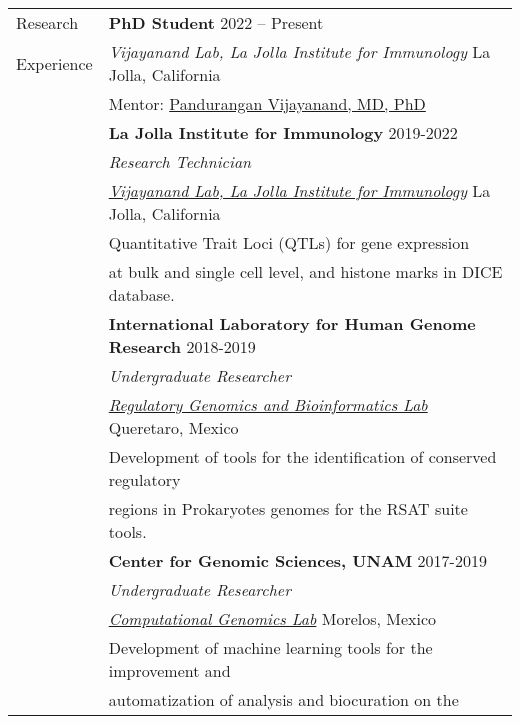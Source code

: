 \documentclass[letterpaper, 11pt]{article}
\begin{document}
\begin{longtable}{@{}p{1.1in}p{6.05in}}

{\sc Research} &
\textbf{PhD Student} \hfill 2022 -- Present   \\
{\sc Experience} & \textit{Vijayanand Lab, La Jolla Institute for Immunology} \hfill La Jolla, California \\
& Mentor: \href{https://www.lji.org/labs/vijayanand/}{Pandurangan Vijayanand, MD, PhD} \\
&\textbf{La Jolla Institute for Immunology} \hfill 2019-2022\\
& \textit{Research Technician}\\
& \href{https://www.lji.org/labs/vijayanand/}{\textit{Vijayanand Lab, La Jolla Institute for Immunology}} \hfill La 
Jolla, California \\
& Quantitative Trait Loci (QTLs) for gene expression \\ & at bulk and single cell level, and histone marks in DICE database.  \\
&\textbf{International Laboratory for Human Genome Research} \hfill 2018-2019\\
& \textit{Undergraduate Researcher}\\
& \href{https://liigh.unam.mx/amedina/}{\textit{Regulatory Genomics and Bioinformatics Lab}} \hfill Queretaro, Mexico \\
& Development of tools for the identification of conserved regulatory \\ & regions in Prokaryotes genomes for the RSAT 
suite tools. \\
&\textbf{Center for Genomic Sciences, UNAM} \hfill 2017-2019\\
& \textit{Undergraduate Researcher}\\
& \href{https://www.ccg.unam.mx/en/computational-genomics/}{\textit{Computational Genomics Lab}} \hfill Morelos, Mexico 
\\
& Development of machine learning tools for the improvement and \\ & automatization of analysis and biocuration on the 

\end{longtable}
\end{document}
